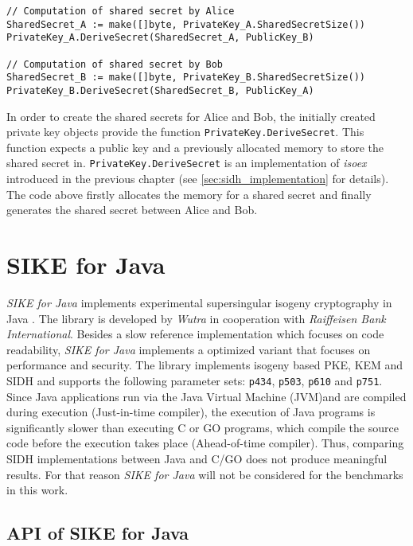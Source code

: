 \begin{lstlisting}[]
// Computation of shared secret by Alice
SharedSecret_A := make([]byte, PrivateKey_A.SharedSecretSize())
PrivateKey_A.DeriveSecret(SharedSecret_A, PublicKey_B)

// Computation of shared secret by Bob
SharedSecret_B := make([]byte, PrivateKey_B.SharedSecretSize())
PrivateKey_B.DeriveSecret(SharedSecret_B, PublicKey_A)
\end{lstlisting}
In order to create the shared secrets for Alice and Bob, the initially created private key objects provide the function \texttt{PrivateKey.DeriveSecret}. This function expects a public key and a previously allocated memory to store the shared secret in. \texttt{PrivateKey.DeriveSecret} is an implementation of \textit{isoex} introduced in the previous chapter (see \autoref{sec:sidh_implementation} for details).\\ 
The code above firstly allocates the memory for a shared secret and finally generates the shared secret between Alice and Bob.
\\
\section{SIKE for Java}
\textit{SIKE for Java} implements experimental supersingular isogeny cryptography in Java \parencite{SikeForJava2020github}. The library is developed by \textit{Wutra} in cooperation with \textit{Raiffeisen Bank International}. Besides a slow reference implementation which focuses on code readability, \textit{SIKE for Java} implements a optimized variant that focuses on performance and security. The library implements isogeny based \gls{PKE}, \gls{KEM} and \gls{SIDH} and supports the following parameter sets: \texttt{p434}, \texttt{p503}, \texttt{p610} and \texttt{p751}.\\
Since Java applications run via the Java Virtual Machine (\gls{JVM})and are compiled during execution (Just-in-time compiler), the execution of Java programs is significantly slower than  executing C or GO programs, which compile the source code before the execution takes place (Ahead-of-time compiler). Thus, comparing SIDH implementations between Java and C/GO does not produce meaningful results. For that reason \textit{SIKE for Java} will not be considered for the benchmarks in this work.

\subsection{API of SIKE for Java}

